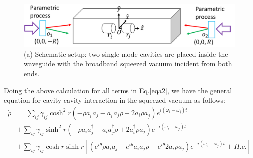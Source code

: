 \documentclass[aps,showpacs,onecolumn,twoside,groupedaddress]{revtex4}
\begin{document}
\begin{figure}
\includegraphics[width=0.8\columnwidth]{fig3.png}
\caption{(a) Schematic setup: two single-mode cavities are placed inside the waveguide with the broadband squeezed vacuum incident from both ends.}
\label{3}
\end{figure}

Doing the above calculation for all terms in Eq.\eqref{eqa2}, we have the general equation for cavity-cavity interaction in the squeezed vacuum as follows:
\begin{equation}
\label{eq0}
\begin{split}
\dot{\rho}&=\sum_{ij}\gamma_{ij}\cosh^{2}r(-\rho a_{i}^{\dagger}a_{j}-a_{i}^{\dagger}a_{j}\rho+2a_{i}\rho a_{j}^{\dagger})e^{i(\omega_{i}-\omega_{j})t}\\
&+\sum_{ij}\gamma_{ij}\sinh^{2}r(-\rho a_{i}a_{j}^{\dagger}-a_{i}a_{j}^{\dagger}\rho+2a_{i}^{\dagger}\rho a_{j})e^{-i(\omega_{i}-\omega_{j})t}\\
&+\sum_{ij}\gamma_{ij}\cosh r\sinh r[(e^{i\theta}\rho a_{i}a_{j}+e^{i\theta}a_{i}a_{j}\rho-e^{i\theta}2a_{i}\rho a_{j})e^{-i(\omega_{i}+\omega_{j})t}+H.c.]\\
\end{split}
\end{equation}
\end{document}
